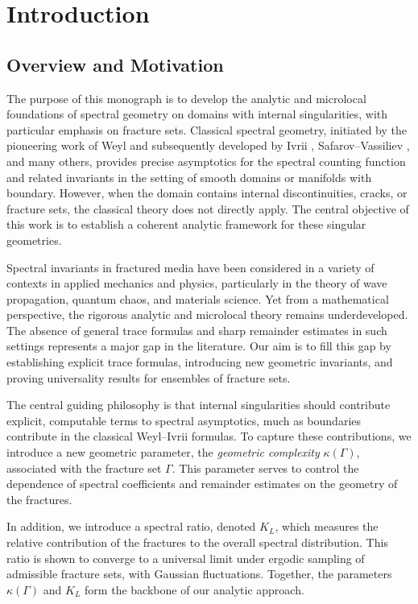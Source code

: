 \chapter{Introduction}
\label{chap:introduction}

\section{Overview and Motivation}

The purpose of this monograph is to develop the analytic and microlocal
foundations of spectral geometry on domains with internal singularities,
with particular emphasis on fracture sets. Classical spectral geometry,
initiated by the pioneering work of Weyl \cite{weyl1911} and subsequently
developed by Ivrii \cite{ivrii1980}, Safarov–Vassiliev \cite{safarov-vassiliev1997},
and many others, provides precise asymptotics for the spectral counting
function and related invariants in the setting of smooth domains or
manifolds with boundary. However, when the domain contains internal
discontinuities, cracks, or fracture sets, the classical theory does not
directly apply. The central objective of this work is to establish a
coherent analytic framework for these singular geometries.

Spectral invariants in fractured media have been considered in a variety
of contexts in applied mechanics and physics, particularly in the theory
of wave propagation, quantum chaos, and materials science. Yet from a
mathematical perspective, the rigorous analytic and microlocal theory
remains underdeveloped. The absence of general trace formulas and sharp
remainder estimates in such settings represents a major gap in the
literature. Our aim is to fill this gap by establishing explicit trace
formulas, introducing new geometric invariants, and proving universality
results for ensembles of fracture sets.

The central guiding philosophy is that internal singularities should
contribute explicit, computable terms to spectral asymptotics, much as
boundaries contribute in the classical Weyl–Ivrii formulas. To capture
these contributions, we introduce a new geometric parameter, the
\emph{geometric complexity} $\kappa(\Gamma)$, associated with the fracture
set $\Gamma$. This parameter serves to control the dependence of spectral
coefficients and remainder estimates on the geometry of the fractures.

In addition, we introduce a spectral ratio, denoted $K_L$, which measures
the relative contribution of the fractures to the overall spectral
distribution. This ratio is shown to converge to a universal limit under
ergodic sampling of admissible fracture sets, with Gaussian fluctuations.
Together, the parameters $\kappa(\Gamma)$ and $K_L$ form the backbone of
our analytic approach.

